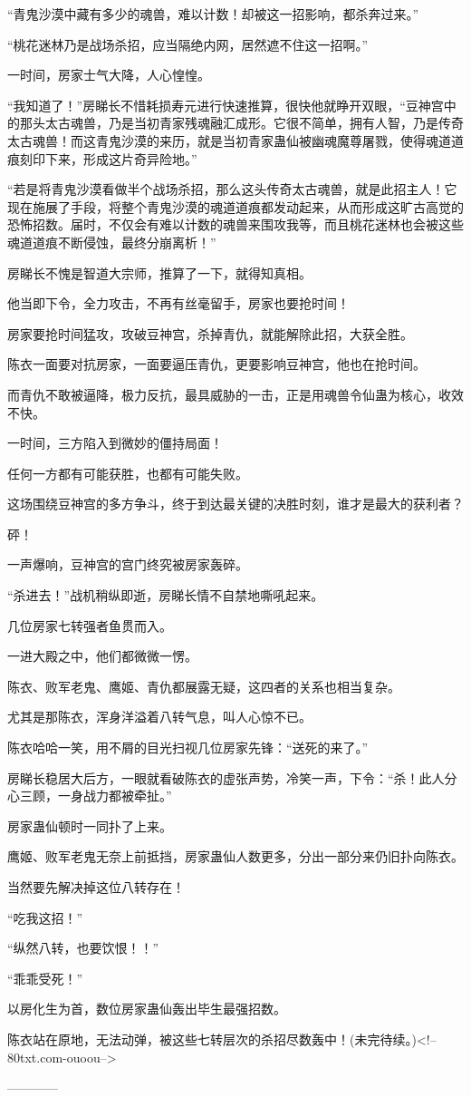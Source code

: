\begin{this_body}
“青鬼沙漠中藏有多少的魂兽，难以计数！却被这一招影响，都杀奔过来。”

“桃花迷林乃是战场杀招，应当隔绝内网，居然遮不住这一招啊。”

一时间，房家士气大降，人心惶惶。

“我知道了！”房睇长不惜耗损寿元进行快速推算，很快他就睁开双眼，“豆神宫中的那头太古魂兽，乃是当初青家残魂融汇成形。它很不简单，拥有人智，乃是传奇太古魂兽！而这青鬼沙漠的来历，就是当初青家蛊仙被幽魂魔尊屠戮，使得魂道道痕刻印下来，形成这片奇异险地。”

“若是将青鬼沙漠看做半个战场杀招，那么这头传奇太古魂兽，就是此招主人！它现在施展了手段，将整个青鬼沙漠的魂道道痕都发动起来，从而形成这旷古高觉的恐怖招数。届时，不仅会有难以计数的魂兽来围攻我等，而且桃花迷林也会被这些魂道道痕不断侵蚀，最终分崩离析！”

房睇长不愧是智道大宗师，推算了一下，就得知真相。

他当即下令，全力攻击，不再有丝毫留手，房家也要抢时间！

房家要抢时间猛攻，攻破豆神宫，杀掉青仇，就能解除此招，大获全胜。

陈衣一面要对抗房家，一面要逼压青仇，更要影响豆神宫，他也在抢时间。

而青仇不敢被逼降，极力反抗，最具威胁的一击，正是用魂兽令仙蛊为核心，收效不快。

一时间，三方陷入到微妙的僵持局面！

任何一方都有可能获胜，也都有可能失败。

这场围绕豆神宫的多方争斗，终于到达最关键的决胜时刻，谁才是最大的获利者？

砰！

一声爆响，豆神宫的宫门终究被房家轰碎。

“杀进去！”战机稍纵即逝，房睇长情不自禁地嘶吼起来。

几位房家七转强者鱼贯而入。

一进大殿之中，他们都微微一愣。

陈衣、败军老鬼、鹰姬、青仇都展露无疑，这四者的关系也相当复杂。

尤其是那陈衣，浑身洋溢着八转气息，叫人心惊不已。

陈衣哈哈一笑，用不屑的目光扫视几位房家先锋：“送死的来了。”

房睇长稳居大后方，一眼就看破陈衣的虚张声势，冷笑一声，下令：“杀！此人分心三顾，一身战力都被牵扯。”

房家蛊仙顿时一同扑了上来。

鹰姬、败军老鬼无奈上前抵挡，房家蛊仙人数更多，分出一部分来仍旧扑向陈衣。

当然要先解决掉这位八转存在！

“吃我这招！”

“纵然八转，也要饮恨！！”

“乖乖受死！”

以房化生为首，数位房家蛊仙轰出毕生最强招数。

陈衣站在原地，无法动弹，被这些七转层次的杀招尽数轰中！(未完待续。)<!--80txt.com-ouoou-->

------------

\end{this_body}

